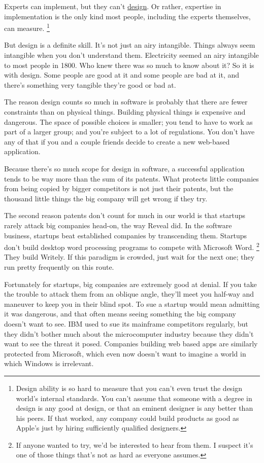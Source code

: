 Experts can implement, but they can't \href{taste.html}{design}. Or
rather, expertise in implementation is the only kind most people,
including the experts themselves, can measure. \footnote{Design ability is so hard to measure that you can't even trust
the design world's internal standards. You can't assume that someone
with a degree in design is any good at design, or that an eminent
designer is any better than his peers. If that worked, any company could
build products as good as Apple's just by hiring sufficiently qualified
designers.}

But design is a definite skill. It's not just an airy intangible. Things
always seem intangible when you don't understand them. Electricity
seemed an airy intangible to most people in 1800. Who knew there was so
much to know about it? So it is with design. Some people are good at it
and some people are bad at it, and there's something very tangible
they're good or bad at.

The reason design counts so much in software is probably that there are
fewer constraints than on physical things. Building physical things is
expensive and dangerous. The space of possible choices is smaller; you
tend to have to work as part of a larger group; and you're subject to a
lot of regulations. You don't have any of that if you and a couple
friends decide to create a new web-based application.

Because there's so much scope for design in software, a successful
application tends to be way more than the sum of its patents. What
protects little companies from being copied by bigger competitors is not
just their patents, but the thousand little things the big company will
get wrong if they try.

The second reason patents don't count for much in our world is that
startups rarely attack big companies head-on, the way Reveal did. In the
software business, startups beat established companies by transcending
them. Startups don't build desktop word processing programs to compete
with Microsoft Word. \footnote{If anyone wanted to try, we'd be interested to hear from them. I
suspect it's one of those things that's not as hard as everyone assumes.} They build Writely. If this
paradigm is crowded, just wait for the next one; they run pretty
frequently on this route.

Fortunately for startups, big companies are extremely good at denial. If
you take the trouble to attack them from an oblique angle, they'll meet
you half-way and maneuver to keep you in their blind spot. To sue a
startup would mean admitting it was dangerous, and that often means
seeing something the big company doesn't want to see. IBM used to sue
its mainframe competitors regularly, but they didn't bother much about
the microcomputer industry because they didn't want to see the threat it
posed. Companies building web based apps are similarly protected from
Microsoft, which even now doesn't want to imagine a world in which
Windows is irrelevant.

